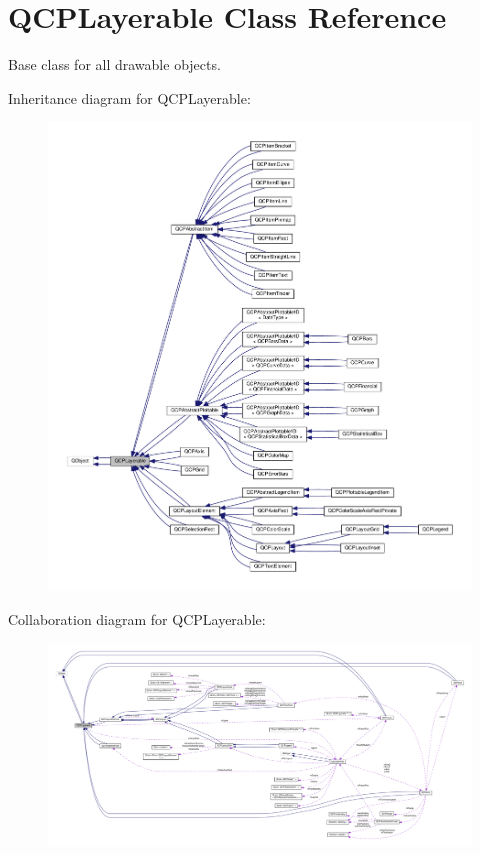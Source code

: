 \hypertarget{class_q_c_p_layerable}{}\section{Q\+C\+P\+Layerable Class Reference}
\label{class_q_c_p_layerable}


Base class for all drawable objects.  




Inheritance diagram for Q\+C\+P\+Layerable\+:\nopagebreak
\begin{figure}[H]
\begin{center}
\leavevmode
\includegraphics[width=350pt]{class_q_c_p_layerable__inherit__graph}
\end{center}
\end{figure}


Collaboration diagram for Q\+C\+P\+Layerable\+:\nopagebreak
\begin{figure}[H]
\begin{center}
\leavevmode
\includegraphics[width=350pt]{class_q_c_p_layerable__coll__graph}
\end{center}
\end{figure}
